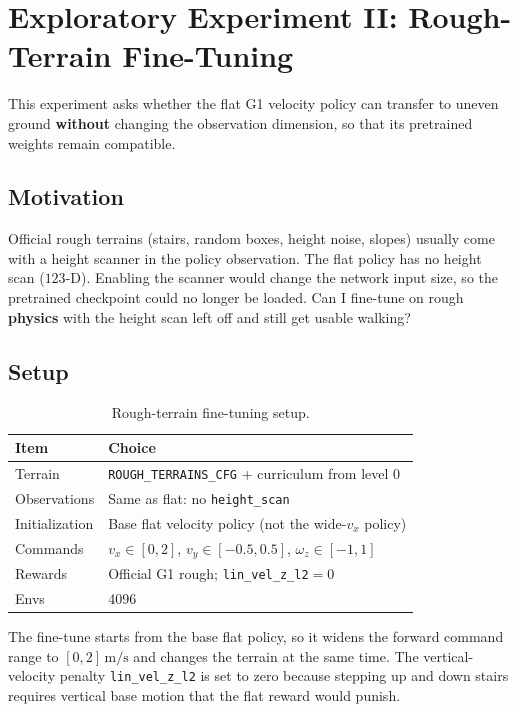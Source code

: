 \documentclass[11pt,a4paper]{article}
\begin{document}
\section{Exploratory Experiment II: Rough-Terrain Fine-Tuning}
\label{sec:rough}

This experiment asks whether the flat G1 velocity policy can transfer to uneven
ground \textbf{without} changing the observation dimension, so that its
pretrained weights remain compatible.

\subsection{Motivation}

Official rough terrains (stairs, random boxes, height noise, slopes) usually
come with a height scanner in the policy observation.
The flat policy has no height scan ($123$-D).
Enabling the scanner would change the network input size, so the pretrained
checkpoint could no longer be loaded.
Can I fine-tune on rough \textbf{physics} with the height scan left off and
still get usable walking?

\subsection{Setup}

\begin{table}[H]
\centering
\small
\begin{tabular}{@{}ll@{}}
\toprule
Item & Choice \\
\midrule
Terrain & \texttt{ROUGH\_TERRAINS\_CFG} + curriculum from level 0 \\
Observations & Same as flat: no \texttt{height\_scan} \\
Initialization & Base flat velocity policy (not the wide-$v_x$ policy) \\
Commands & $v_x\in[0,2]$, $v_y\in[-0.5,0.5]$, $\omega_z\in[-1,1]$ \\
Rewards & Official G1 rough; \texttt{lin\_vel\_z\_l2}${}=0$ \\
Envs & 4096 \\
\bottomrule
\end{tabular}
\caption{Rough-terrain fine-tuning setup.}
\label{tab:rough}
\end{table}

The fine-tune starts from the base flat policy, so it widens the forward
command range to $[0,2]\,\mathrm{m/s}$ and changes the terrain at the same
time. The vertical-velocity penalty \texttt{lin\_vel\_z\_l2} is set to zero
because stepping up and down stairs requires vertical base motion that the
flat reward would punish.
\end{document}
